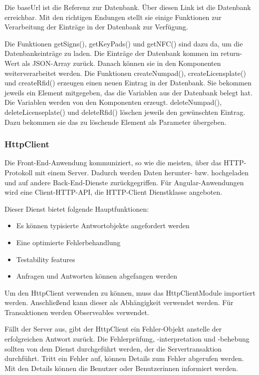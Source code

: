 Die baseUrl ist die Referenz zur Datenbank. Über diesen Link ist die Datenbank erreichbar. Mit den richtigen Endungen stellt sie einige Funktionen zur Verarbeitung der Einträge in der Datenbank zur Verfügung.

Die Funktionen getSigns(), getKeyPads() und getNFC() sind dazu da, um die Datenbankeinträge zu laden. Die Einträge der Datenbank kommen im return-Wert als JSON-Array zurück. Danach können sie in den Komponenten weiterverarbeitet werden.
Die Funktionen createNumpad(), createLicensplate() und createRfid() erzeugen einen neuen Eintrag in der Datenbank. Sie bekommen jeweils ein Element mitgegeben, das die Variablen aus der Datenbank belegt hat. Die Variablen werden von den Komponenten erzeugt.
deleteNumpad(), deleteLicenseplate() und deleteRfid() löschen jeweils den gewünschten Eintrag. Dazu bekommen sie das zu löschende Element als Parameter übergeben.


\subsubsection{HttpClient}
Die Front-End-Anwendung kommuniziert, so wie die meisten, über das HTTP-Protokoll mit einem Server. Dadurch werden Daten herunter- bzw. hochgeladen und auf andere Back-End-Dienste zurückgegriffen. Für Angular-Anwendungen wird eine Client-HTTP-API, die HTTP-Client Dienstklasse angeboten.

Dieser Dienst bietet folgende Hauptfunktionen:
\begin{itemize}
    \item Es können typisierte Antwortobjekte angefordert werden
    \item Eine optimierte Fehlerbehandlung
    \item Testability features
    \item Anfragen und Antworten können abgefangen werden    
\end{itemize}

Um den HttpClient verwenden zu können, muss das HttpClientModule importiert werden. Anschließend kann dieser als Abhängigkeit verwendet werden. Für Transaktionen werden Observeables verwendet.

Fällt der Server aus, gibt der HttpClient ein Fehler-Objekt anstelle der erfolgreichen Antwort zurück. Die Fehlerprüfung, -interpretation und -behebung sollten von dem Dienst durchgeführt werden, der die Servertransaktion durchführt. Tritt ein Fehler auf, können Details zum Fehler abgerufen werden. Mit den Details können die Benutzer oder Benutzerinnen informiert werden. 

